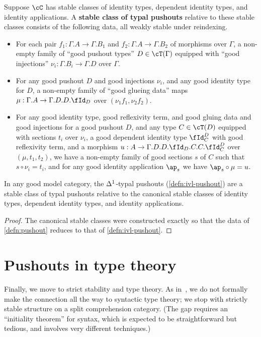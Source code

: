\documentclass{amsart}
\let\C\cC
\let\T\cT
\let\Id\fId
\begin{document}
\begin{defn}\label{defn:pushout}
  Suppose $\C$ has stable classes of identity types, dependent identity types, and identity applications.
  A \textbf{stable class of typal pushouts} relative to these stable classes consists of the following data, all weakly stable under reindexing.
  \begin{itemize}
  \item For each pair $f_1:\Gamma.A\to \Gamma.B_1$ and $f_2:\Gamma.A\to \Gamma.B_2$ of morphisms over $\Gamma$, a non-empty family of ``good pushout types'' $D\in\T(\Gamma)$ equipped with ``good injections'' $\nu_i : \Gamma.B_i \to \Gamma.D$ over $\Gamma$.
  \item For any good pushout $D$ and good injections $\nu_i$, and any good identity type for $D$, a non-empty family of ``good glueing data'' maps $\mu : \Gamma.A \to \Gamma.D.D.\Id_D$ over $(\nu_1 f_1,\nu_2 f_2)$.
  \item For any good identity type, good reflexivity term, and good gluing data and good injections for a good pushout $D$, and any type $C\in\T(D)$ equipped with sections $t_i$ over $\nu_i$, a good dependent identity type $\Id^D_C$ with good reflexivity term, and a morphism $u:A\to \Gamma.D.D.\Id_D.C.C.\Id^D_C$ over $(\mu,t_1,t_2)$, we have a non-empty family of good sections $s$ of $C$ such that $s \circ \nu_i = t_i$, and for any good identity application $\ap_s$ we have $\ap_s \circ \mu = u$.
  \end{itemize}
\end{defn}

\begin{thm}\label{thm:model-pushout}
  In any good model category, the ${\Delta^1}$-typal pushouts (\cref{defn:ivl-pushout}) are a stable class of typal pushouts relative to the canonical stable classes of identity types, dependent identity types, and identity applications.
\end{thm}
\begin{proof}
  The canonical stable classes were constructed exactly so that the data of \cref{defn:pushout} reduces to that of \cref{defn:ivl-pushout}.
\end{proof}


\section{Pushouts in type theory}
\label{sec:pushouts-type-theory}

Finally, we move to strict stability and type theory.
As in~\cite{lw:localuniv}, we do not formally make the connection all the way to syntactic type theory; we stop with strictly stable structure on a split comprehension category.
(The gap requires an ``initiality theorem'' for syntax, which is expected to be straightforward but tedious, and involves very different techniques.)
\end{document}
